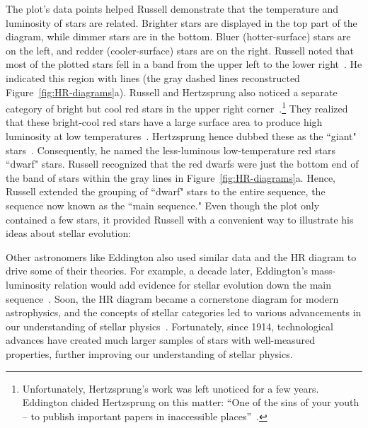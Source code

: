 The plot's data points helped Russell demonstrate that the temperature and luminosity of stars are related.
Brighter stars are displayed in the top part of the diagram, while dimmer stars are in the bottom. 
Bluer (hotter-surface) stars are on the left, and redder (cooler-surface) stars are on the right. 
Russell noted that most of the plotted stars fell in a band from the upper left to the lower right~\cite{Russell:1914:PA}.
He indicated this region with lines (the gray dashed lines reconstructed Figure~\ref{fig:HR-diagrams}a).
Russell and Hertzsprung also noticed a separate category of bright but cool red stars in the upper right corner~\cite{Russell:1914:PA, Hertzsprung:1911:POPot}.\footnote{Unfortunately, Hertzsprung's work was left unoticed for a few years. Eddington chided Hertzsprung on this matter: ``One of the sins of your youth – to publish important papers in inaccessible
places''~\cite{Nielsen:1964:Cent}.}
They realized that these bright-cool red stars have a large surface area to produce high luminosity at low temperatures~\cite{Russell:1914:PA, Maury:1897:AnHar, Hertzsprung:1911:POPot}. 
Hertzsprung hence dubbed these as the ``giant" stars~\cite{Nielsen:1964:Cent}.  
Consequently, he named the less-luminous low-temperature red stars ``dwarf" stars. 
Russell recognized that the red dwarfs were just the bottom end of the band of stars within the gray lines in Figure~\ref{fig:HR-diagrams}a. 
Hence, Russell extended the grouping of ``dwarf" stars to the entire sequence, the sequence now known as the ``main sequence."
Even though the plot only contained a few stars, it provided Russell with a convenient way to illustrate his ideas about stellar evolution:

Other astronomers like Eddington also used similar data and the HR diagram to drive some of their theories. 
For example, a decade later, Eddington's mass-luminosity relation would add evidence for stellar evolution down the main sequence~\cite{Eddington:1924:MNRAS}.
Soon, the HR diagram became a cornerstone diagram for modern astrophysics, and the concepts of stellar categories led to various advancements in our understanding of stellar physics~\cite{Nielsen:1964:Cent, 1914_HR_data}. 
Fortunately, since 1914, technological advances have created much larger samples of stars with well-measured properties, further improving our understanding of stellar physics.



